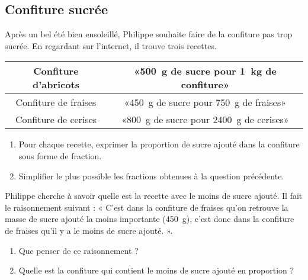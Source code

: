 
\subsection*{Confiture sucrée}

Après un bel été bien ensoleillé, Philippe souhaite faire de la confiture pas trop sucrée. En regardant sur l'internet, il trouve trois recettes.

\begin{center}
    \begin{tabular}[]{|c|c|}
        \hline
        Confiture d'abricots& «\SI{500}{\gram} de sucre pour \SI{1}{\kilo\gram} de confiture» \\
        \hline
        Confiture de fraises&«\SI{450}{\gram} de sucre pour \SI{750}{\gram} de fraises» \\
        \hline
        Confiture de cerises&  «\SI{800}{\gram} de sucre pour \SI{2400}{\gram} de cerises» \\ 
        \hline
    \end{tabular}
\end{center}

\begin{enumerate}
    \item
Pour chaque recette, exprimer la proportion de sucre ajouté dans la confiture sous forme de fraction.
\item
    Simplifier le plus possible les fractions obtenues à la question précédente.
\end{enumerate}

Philippe cherche à savoir quelle est la recette avec le moins de sucre ajouté. Il fait le raisonnement suivant : « C'est dans la confiture de fraises qu'on retrouve la masse de sucre ajouté la moins importante (\SI{450}{\gram}), c'est donc dans la confiture de fraises qu'il y a le moins de sucre ajouté. ». 

\begin{enumerate}
    \item
Que penser de ce raisonnement ?
\item
Quelle est la confiture qui contient le moins de sucre ajouté en proportion ?
\end{enumerate}
